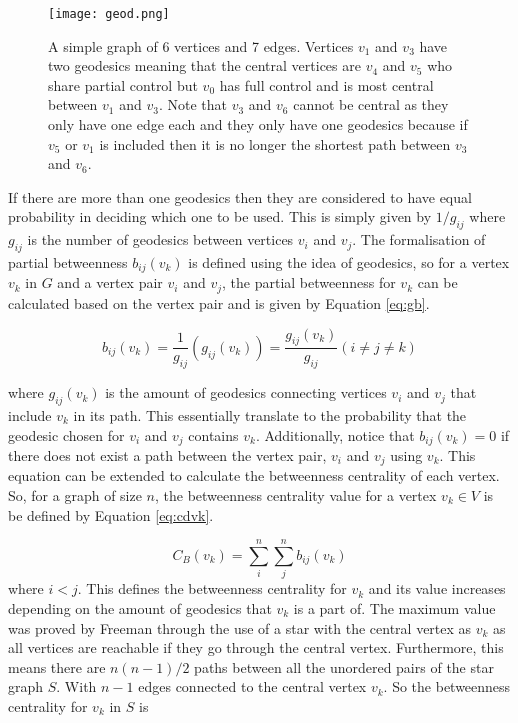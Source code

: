 \begin{figure}[!htb]
	\centering
	\texttt{[image: geod.png]}
	\caption{A simple graph of 6 vertices and 7 edges. Vertices $v_1$ and $v_3$ have two geodesics meaning that the central vertices are $v_4$ and $v_5$ who share partial control but $v_0$ has full control and is most central between $v_1$ and $v_3$. Note that $v_3$ and $v_6$ cannot be central as they only have one edge each and they only have one geodesics because if $v_5$ or $v_1$ is included then it is no longer the shortest path between $v_3$ and $v_6$.}
	\label{fig:geodesics}
\end{figure}

If there are more than one geodesics then they are considered to have equal probability in deciding which one to be used. This is simply given by $1/g_{ij}$ where $g_{ij}$ is the number of geodesics between vertices $v_i$ and $v_j$. The formalisation of partial betweenness $b_{ij}(v_k)$ is defined using the idea of geodesics, so for a vertex $v_k$ in $G$ and a vertex pair $v_i$ and $v_j$, the partial betweenness for $v_k$ can be calculated based on the vertex pair and is given by Equation \ref{eq:gb}.

\begin{equation} \label{eq:gb}
b_{ij}(v_k) = \frac{1}{g_{ij}}(g_{ij}(v_k)) = \frac{g_{ij}(v_k)}{g_{ij}} (i \ne j \ne k)
\end{equation}

where $g_{ij}(v_k)$ is the amount of geodesics connecting vertices $v_i$ and $v_j$ that include $v_k$ in its path. This essentially translate to the probability that the geodesic chosen for $v_i$ and $v_j$ contains $v_k$. Additionally, notice that $b_{ij}(v_k) = 0$ if there does not exist a path between the vertex pair, $v_i$ and $v_j$ using $v_k$.
This equation can be extended to calculate the betweenness centrality of each vertex. So, for a graph of size $n$, the betweenness centrality value for a vertex $v_k \in V$ is be defined by Equation \ref{eq:cdvk}.

\begin{equation}\label{eq:cdvk}
C_B(v_k)= \sum_i^n\sum_j^n b_{ij}(v_k)
\end{equation}
where $i < j$. This defines the betweenness centrality for $v_k$ and its value increases depending on the amount of geodesics that $v_k$ is a part of. The maximum value \cite{freeman2002centrality} was proved by Freeman through the use of a star with the central vertex as $v_k$ as all vertices are reachable if they go through the central vertex. Furthermore, this means there are $n(n-1)/2$ paths between all the unordered pairs of the star graph $S$. With $n-1$ edges connected to the central vertex $v_k$. So the betweenness centrality for $v_k$ in $S$ is

